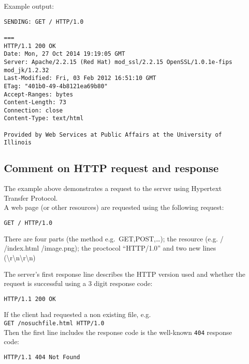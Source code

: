 Example output:

\begin{verbatim}
SENDING: GET / HTTP/1.0

===
HTTP/1.1 200 OK
Date: Mon, 27 Oct 2014 19:19:05 GMT
Server: Apache/2.2.15 (Red Hat) mod_ssl/2.2.15 OpenSSL/1.0.1e-fips mod_jk/1.2.32
Last-Modified: Fri, 03 Feb 2012 16:51:10 GMT
ETag: "401b0-49-4b8121ea69b80"
Accept-Ranges: bytes
Content-Length: 73
Connection: close
Content-Type: text/html

Provided by Web Services at Public Affairs at the University of Illinois
\end{verbatim}

\subsection{Comment on HTTP request and
response}\label{comment-on-http-request-and-response}

The example above demonstrates a request to the server using Hypertext
Transfer Protocol.\\A web page (or other resources) are requested using
the following request:

\begin{verbatim}
GET / HTTP/1.0
\end{verbatim}

There are four parts (the method e.g.~GET,POST,\ldots{}); the resource
(e.g. / /index.html /image.png); the proctocol ``HTTP/1.0'' and two new
lines
(\textbackslash{}r\textbackslash{}n\textbackslash{}r\textbackslash{}n)

The server's first response line describes the HTTP version used and
whether the request is successful using a 3 digit response code:

\begin{verbatim}
HTTP/1.1 200 OK
\end{verbatim}

If the client had requested a non existing file, e.g.
\texttt{GET\ /nosuchfile.html\ HTTP/1.0}\\Then the first line includes
the response code is the well-known \texttt{404} response code:

\begin{verbatim}
HTTP/1.1 404 Not Found
\end{verbatim}

